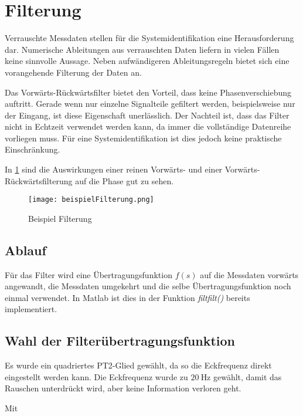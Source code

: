
\section{Filterung} %

Verrauschte Messdaten stellen für die Systemidentifikation eine Herausforderung dar. Numerische Ableitungen aus verrauschten Daten liefern in vielen Fällen keine sinnvolle Aussage. Neben aufwändigeren Ableitungsregeln bietet sich eine vorangehende Filterung der Daten an.

Das Vorwärts-Rückwärtsfilter bietet den Vorteil, dass keine Phasenverschiebung 
auftritt. Gerade wenn nur einzelne Signalteile gefiltert werden, beispielsweise 
nur der Eingang, ist diese Eigenschaft unerlässlich. Der Nachteil ist, dass das 
Filter nicht in Echtzeit verwendet werden kann, da immer die vollständige 
Datenreihe vorliegen muss. Für eine Systemidentifikation ist dies jedoch keine 
praktische Einschränkung.

In \cref{fig:filterBsp} sind die Auswirkungen einer reinen Vorwärts- und einer Vorwärts-Rückwärtsfilterung auf die Phase 
gut zu sehen.

\begin{figure}[h!]
	\centering
	\texttt{[image: beispielFilterung.png]}
	\caption{Beispiel Filterung}
	\label{fig:filterBsp}
\end{figure}


\subsection{Ablauf}

Für das Filter wird eine Übertragungsfunktion $f(s)$ auf die Messdaten vorwärts 
angewandt, die Messdaten umgekehrt und die selbe Übertragungsfunktion noch 
einmal verwendet. In Matlab ist dies in der Funktion \textit{filtfilt()} 
bereits implementiert. 

\subsection{Wahl der Filterübertragungsfunktion}

Es wurde ein quadriertes PT2-Glied gewählt, da so die Eckfrequenz direkt eingestellt werden kann. Die Eckfrequenz wurde zu $ 
\SI{20}{\hertz} $ gewählt, damit das Rauschen unterdrückt wird, aber keine Information verloren geht.

Mit

